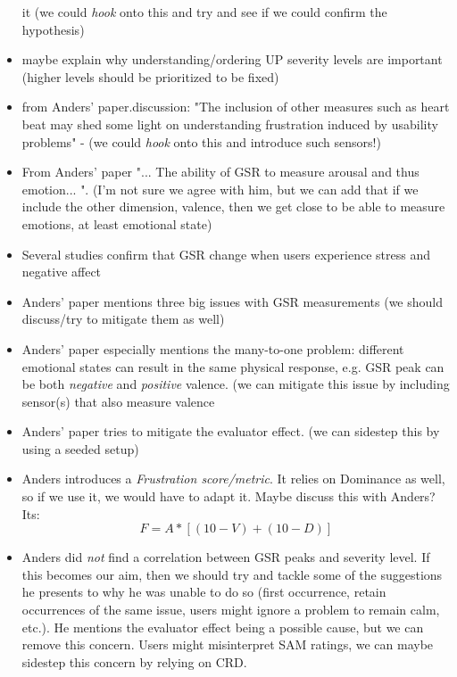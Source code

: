 \begin{itemize}
        it (we could \textit{hook}
        onto this and try and see if we could confirm the hypothesis)
    \item maybe explain why understanding/ordering UP severity levels are important
        (higher levels should be prioritized to be fixed)
    \item from Anders' paper.discussion: "The inclusion of other measures such as heart
        beat may shed some light on understanding frustration induced by
        usability problems" - (we could \textit{hook} onto this and introduce such
        sensors!)
    \item From Anders' paper "... The ability of GSR to measure arousal and thus emotion... ". (I'm not sure we agree with him, but we can add that if we include the other dimension, valence, then we get close to be able to measure emotions, at least emotional state)
    \item Several studies confirm that GSR change when users experience stress and negative affect
    \item Anders' paper mentions three big issues with GSR measurements (we should discuss/try to mitigate them as well)
    \item Anders' paper especially mentions the many-to-one problem: different emotional states can result in the same physical response, e.g. GSR peak can be both \textit{negative} and \textit{positive} valence. (we can mitigate this issue by including sensor(s) that also measure valence
    \item Anders' paper tries to mitigate the evaluator effect. (we can sidestep this by using a seeded setup)
    \item Anders introduces a \textit{Frustration score/metric}. It relies on Dominance as well, so if we use it, we would have to adapt it. Maybe discuss this with Anders? Its: \[F = A * [(10-V) + (10-D)]\]

    \item Anders did \textit{not} find a correlation between GSR peaks and
        severity level. If this becomes our aim, then we should try and tackle
        some of the suggestions he presents to why he was unable to do so
        (first occurrence, retain occurrences of the same issue, users might
        ignore a problem to remain calm, etc.). He mentions the evaluator
        effect being a possible cause, but we can remove this concern. Users
        might misinterpret SAM ratings, we can maybe sidestep this concern by
        relying on CRD.
\end{itemize}
